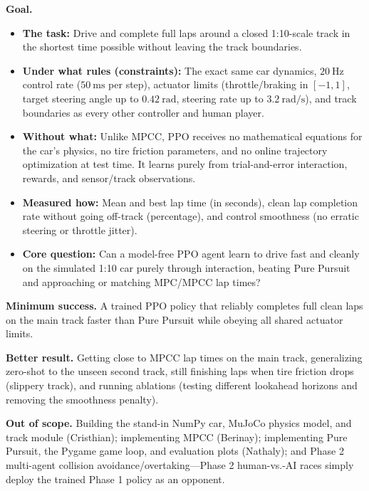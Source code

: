 \documentclass[11pt]{article}
\begin{document}
\noindent\textbf{Goal.}
\begin{itemize}[leftmargin=1.5em, itemsep=0.25em]
    \item \textbf{The task:} Drive and complete full laps around a closed 1:10-scale track in the shortest time possible without leaving the track boundaries.
    \item \textbf{Under what rules (constraints):} The exact same car dynamics, $20~\text{Hz}$ control rate ($50~\text{ms}$ per step), actuator limits (throttle/braking in $[-1, 1]$, target steering angle up to $0.42~\text{rad}$, steering rate up to $3.2~\text{rad/s}$), and track boundaries as every other controller and human player.
    \item \textbf{Without what:} Unlike MPCC, PPO receives no mathematical equations for the car's physics, no tire friction parameters, and no online trajectory optimization at test time. It learns purely from trial-and-error interaction, rewards, and sensor/track observations.
    \item \textbf{Measured how:} Mean and best lap time (in seconds), clean lap completion rate without going off-track (percentage), and control smoothness (no erratic steering or throttle jitter).
    \item \textbf{Core question:} Can a model-free PPO agent learn to drive fast and cleanly on the simulated 1:10 car purely through interaction, beating Pure Pursuit and approaching or matching MPC/MPCC lap times?
\end{itemize}

\noindent\textbf{Minimum success.} A trained PPO policy that reliably completes full clean laps on the main track faster than Pure Pursuit while obeying all shared actuator limits.

\noindent\textbf{Better result.} Getting close to MPCC lap times on the main track, generalizing zero-shot to the unseen second track, still finishing laps when tire friction drops (slippery track), and running ablations (testing different lookahead horizons and removing the smoothness penalty).

\noindent\textbf{Out of scope.} Building the stand-in NumPy car, MuJoCo physics model, and track module (Cristhian); implementing MPCC (Berinay); implementing Pure Pursuit, the Pygame game loop, and evaluation plots (Nathaly); and Phase 2 multi-agent collision avoidance/overtaking---Phase 2 human-vs.-AI races simply deploy the trained Phase 1 policy as an opponent.

\end{document}
